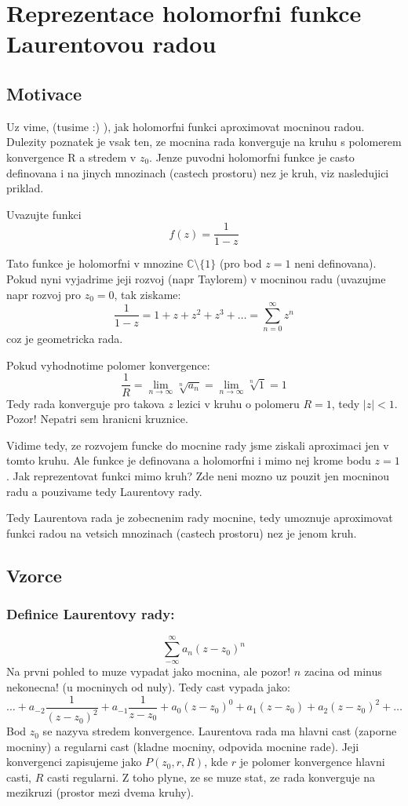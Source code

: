 \chapter{Reprezentace holomorfni funkce Laurentovou radou}

\section*{Motivace}

Uz vime, (tusime :) ), jak holomorfni funkci aproximovat mocninou radou. Dulezity poznatek je vsak ten, ze mocnina rada konverguje na kruhu s polomerem konvergence R a stredem v $z_0$. Jenze puvodni holomorfni funkce je casto definovana i na jinych mnozinach (castech prostoru) nez je kruh, viz nasledujici priklad.

Uvazujte funkci
$$f(z) = \frac{1}{1-z}$$

Tato funkce je holomorfni v mnozine $\mathbb{C} \setminus \{1 \}$ (pro bod $z=1$ neni definovana). Pokud nyni vyjadrime jeji rozvoj (napr Taylorem) v mocninou radu (uvazujme napr rozvoj pro $z_0 = 0$, tak ziskame:
$$\frac{1}{1-z} = 1 + z + z^2 + z^3 + \dots = \sum_{n=0}^\infty z^n$$
coz je geometricka rada.

Pokud vyhodnotime polomer konvergence:
$$\frac{1}{R} = \lim_{n \to \infty} \sqrt[n]{a_n} = \lim_{n \to \infty} \sqrt[n]{1} = 1$$
Tedy rada konverguje pro takova $z$ lezici v kruhu o polomeru $R = 1$, tedy $|z|<1$. Pozor! Nepatri sem hranicni kruznice.

Vidime tedy, ze rozvojem funcke do mocnine rady jsme ziskali aproximaci jen v tomto kruhu. Ale funkce je definovana a holomorfni i mimo nej krome bodu $z = 1$. Jak reprezentovat funkci mimo kruh? Zde neni mozno uz pouzit jen mocninou radu a pouzivame tedy Laurentovy rady.

Tedy Laurentova rada je zobecnenim rady mocnine, tedy umoznuje aproximovat funkci radou na vetsich mnozinach (castech prostoru) nez je jenom kruh.
\section*{Vzorce}

\subsection*{Definice Laurentovy rady:} 
\begin{equation}
\label{eq:lau_def}
\sum_{-\infty}^\infty a_n (z-z_0)^n
\end{equation}
Na prvni pohled to muze vypadat jako mocnina, ale pozor! $n$ zacina od minus nekonecna! (u mocninych od nuly). Tedy cast vypada jako:
$$\dots + a_{-2} \frac{1}{(z-z_0)^2} + a_{-1}\frac{1}{z-z_0} + a_0(z-z_0)^0 + a_1(z-z_0)+ a_2 (z-z_0)^2 + \dots$$
Bod $z_0$ se nazyva stredem konvergence.
Laurentova rada ma hlavni cast (zaporne mocniny) a regularni cast (kladne mocniny, odpovida mocnine rade). Jeji konvergenci zapisujeme jako $P(z_0,r,R)$, kde $r$ je polomer konvergence hlavni casti, $R$ casti regularni. Z toho plyne, ze se muze stat, ze rada konverguje na mezikruzi (prostor mezi dvema kruhy).

